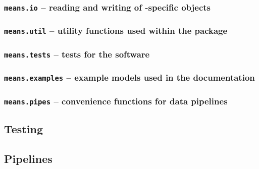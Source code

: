 \subsubsection{{\tt means.io} -- reading and writing of \means-specific objects}
\subsubsection{{\tt means.util} -- utility functions used within the package}
\subsubsection{{\tt means.tests} -- tests for the software}
\subsubsection{{\tt means.examples} -- example models used in the documentation}
\subsubsection{{\tt means.pipes} -- convenience functions for data pipelines}

\subsection{Testing}
\subsection{Pipelines}

